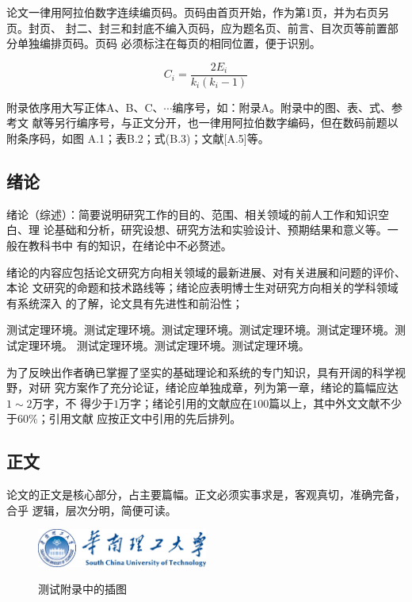 \documentclass[phd,nobackinfo]{scutthesis}
\begin{document}
论文一律用阿拉伯数字连续编页码。页码由首页开始，作为第1页，并为右页另页。封页、
封二、封三和封底不编入页码，应为题名页、前言、目次页等前置部分单独编排页码。页码
必须标注在每页的相同位置，便于识别。

\begin{equation}
    C_i = \frac{2E_i}{k_i(k_i-1)}
\end{equation}

附录依序用大写正体A、B、C、$\cdots$编序号，如：附录A。附录中的图、表、式、参考文
献等另行编序号，与正文分开，也一律用阿拉伯数字编码，但在数码前题以附条序码，如图
A.1；表B.2；式(B.3)；文献[A.5]等。

\subsection{绪论}

绪论（综述）：简要说明研究工作的目的、范围、相关领域的前人工作和知识空白、理
论基础和分析，研究设想、研究方法和实验设计、预期结果和意义等。一般在教科书中
有的知识，在绪论中不必赘述。

绪论的内容应包括论文研究方向相关领域的最新进展、对有关进展和问题的评价、本论
文研究的命题和技术路线等；绪论应表明博士生对研究方向相关的学科领域有系统深入
的了解，论文具有先进性和前沿性；

\begin{problem}
测试定理环境。测试定理环境。测试定理环境。测试定理环境。测试定理环境。测试定理环境。
测试定理环境。测试定理环境。测试定理环境。
\end{problem}

为了反映出作者确已掌握了坚实的基础理论和系统的专门知识，具有开阔的科学视野，对研
究方案作了充分论证，绪论应单独成章，列为第一章，绪论的篇幅应达$1\sim 2$万字，不
得少于$1$万字；绪论引用的文献应在$100$篇以上，其中外文文献不少于$60\%$；引用文献
应按正文中引用的先后排列。

\subsection{正文}

论文的正文是核心部分，占主要篇幅。正文必须实事求是，客观真切，准确完备，合乎
逻辑，层次分明，简便可读。

\begin{figure}[htbp]
  \centering
  \includegraphics[width= 0.5\textwidth]{scutlogo.eps}\\
  \caption{测试附录中的插图}\label{fig:appendix2}
\end{figure}
\end{document}
